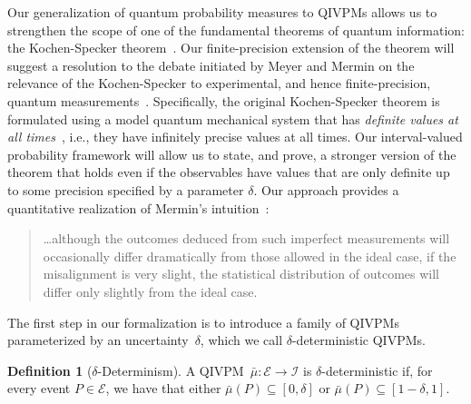 \documentclass[english,reprint, aps, prl,superscriptaddress, showpacs,
showkeys, longbibliography, amsmath, amssymb, floatfix]{revtex4-1}
\theoremstyle{plain}
\theoremstyle{definition}
\newtheorem{definition}{Definition}
\newcommand{\events}{\ensuremath{\mathcal{E}}}
\begin{document}
Our generalization of quantum probability measures to QIVPMs allows us
to strengthen the scope of one of the fundamental theorems of quantum
information: the Kochen-Specker
theorem~\cite{kochenspecker1967,Redhead1987-REDINA,peres1995quantum,Jaeger2007,Held2016}. Our
finite-precision extension of the theorem will suggest a resolution to
the debate initiated by Meyer and Mermin on the relevance of the
Kochen-Specker to experimental, and hence finite-precision, quantum
measurements~\citep{PhysRevLett.83.3751,Mermin1999,Kent1999,HavlicekKrennSummhammerSvozil2001,SimonBruknerZeilinger2001,Cabello2002,Larsson2002,Appleby2002,BarrettKent2004,Appleby_2005,Spekkens2005,GuehneKleinmannCabelloEtAl2010,MazurekPuseyKunjwalEtAl2016}.
Specifically, the original Kochen-Specker theorem is formulated
using a model quantum mechanical system that
has \emph{definite values at all times}~\cite{Held2016}, i.e., they
have infinitely precise values at all times. Our interval-valued
probability framework will allow us to state, and prove, a stronger
version of the theorem that holds even if the observables have values
that are only definite up to some precision specified by a parameter
$\delta$. Our approach provides a quantitative realization of
Mermin's intuition~\citep{Mermin1999}:
\begin{quote}
  \ldots although the outcomes deduced from such imperfect
  measurements will occasionally differ dramatically from those
  allowed in the ideal case, if the misalignment is very slight, the
  statistical distribution of outcomes will differ only slightly from
  the ideal case.
\end{quote}


The first step in our formalization is to introduce a family of QIVPMs
parameterized by an uncertainty~$\delta$, which we call
$\delta$-deterministic QIVPMs.

\begin{definition}[$\delta$-Determinism]\label{def:delta-deterministic} A
  QIVPM~$\bar{\mu}:\events\rightarrow\mathscr{I}$ is
  $\delta$-deterministic if, for every event $P\in\events$, we have
  that either 
  $\bar{\mu}\left(P\right)\subseteq\left[0,\delta\right]$ or
  $\bar{\mu}\left(P\right)\subseteq\left[1-\delta,1\right]$. 
\end{definition}
\end{document}
